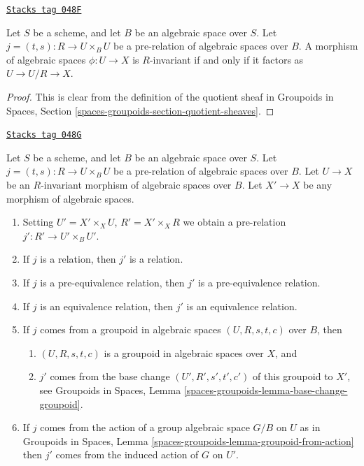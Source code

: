 \begin{lemma}[Invariant]
\label{groupoids-quotients-lemma-invariant}
\href{https://stacks.math.columbia.edu/tag/048F}{\texttt{Stacks tag 048F}}

Let $S$ be a scheme, and let $B$ be an algebraic space over $S$.
Let $j = (t, s) : R \to U \times_B U$ be a pre-relation of algebraic
spaces over $B$. A morphism of algebraic spaces $\phi : U \to X$ is
$R$-invariant if and only if it factors as
$U \to U/R \to X$.
\end{lemma}

\begin{proof}
This is clear from the definition of the quotient sheaf in
Groupoids in Spaces, Section \ref{spaces-groupoids-section-quotient-sheaves}.
\end{proof}

\begin{lemma}
\label{groupoids-quotients-lemma-base-change-on-invariant}
\href{https://stacks.math.columbia.edu/tag/048G}{\texttt{Stacks tag 048G}}

Let $S$ be a scheme, and let $B$ be an algebraic space over $S$.
Let $j = (t, s) : R \to U \times_B U$ be a pre-relation of algebraic
spaces over $B$. Let $U \to X$ be an $R$-invariant morphism of algebraic
spaces over $B$. Let $X' \to X$ be any morphism of algebraic spaces.
\begin{enumerate}
\item Setting $U' = X' \times_X U$, $R' = X' \times_X R$ we obtain
a pre-relation $j' : R' \to U' \times_B U'$.
\item If $j$ is a relation, then $j'$ is a relation.
\item If $j$ is a pre-equivalence relation, then $j'$ is a
pre-equivalence relation.
\item If $j$ is an equivalence relation, then $j'$ is an equivalence
relation.
\item If $j$ comes from a groupoid in algebraic spaces
$(U, R, s, t, c)$ over $B$, then
\begin{enumerate}
\item $(U, R, s, t, c)$ is a groupoid in algebraic spaces over $X$, and
\item $j'$ comes from the base change $(U', R', s', t', c')$
of this groupoid to $X'$, see
Groupoids in Spaces, Lemma
\ref{spaces-groupoids-lemma-base-change-groupoid}.
\end{enumerate}
\item If $j$ comes from the action of a group algebraic space $G/B$ on $U$
as in Groupoids in Spaces, Lemma
\ref{spaces-groupoids-lemma-groupoid-from-action}
then $j'$ comes from the induced action of $G$ on $U'$.
\end{enumerate}
\end{lemma}

